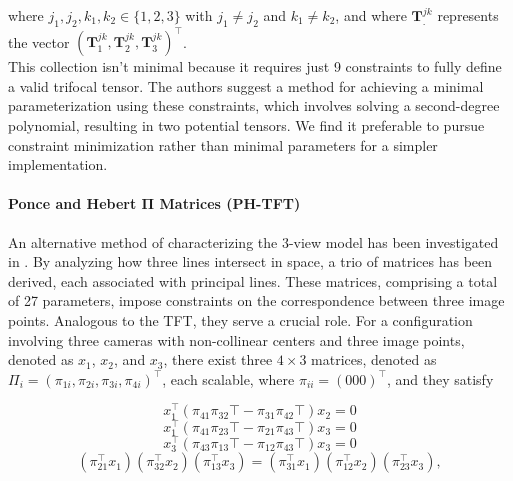 where \( j_1, j_2, k_1, k_2 \in \{1, 2, 3\} \) with \( j_1 \neq j_2 \) and \( k_1 \neq k_2 \), and where \( \bm{T}_.^{jk} \) represents the vector \( (\bm{T}_1^{jk}, \bm{T}_2^{jk}, \bm{T}_3^{jk})^\top \).\\

This collection isn't minimal because it requires just 9 constraints to fully define a valid trifocal tensor. The authors suggest a method for achieving a minimal parameterization using these constraints, which involves solving a second-degree polynomial, resulting in two potential tensors. We find it preferable to pursue constraint minimization rather than minimal parameters for a simpler implementation.

\paragraph{Ponce and Hebert \( \bm{\Pi} \) Matrices (\acs{PH-TFT})}
An alternative method of characterizing the 3-view model has been investigated in \cite{8-ponce-hebert-param}. By analyzing how three lines intersect in space, a trio of matrices has been derived, each associated with principal lines. These matrices, comprising a total of 27 parameters, impose constraints on the correspondence between three image points. Analogous to the TFT, they serve a crucial role. For a configuration involving three cameras with non-collinear centers and three image points, denoted as \( x_1 \), \( x_2 \), and \( x_3 \), there exist three \( 4 \times 3 \) matrices, denoted as \( \Pi_i = (\pi_{1i}, \pi_{2i}, \pi_{3i}, \pi_{4i})^\top \), each scalable, where \( \pi_{ii} = (0 0 0)^\top \), and they satisfy

\begin{equation}
	x_1^\top (\pi_{41}\pi_{32}\top - \pi_{31}\pi_{42}\top) x_2 = 0
	\label{eq:phConst1}
\end{equation}
\begin{equation}
	x_1^\top (\pi_{41}\pi_{23}\top - \pi_{21}\pi_{43}\top) x_3 = 0
	\label{eq:phConst2}
\end{equation}
\begin{equation}
	x_3^\top (\pi_{43}\pi_{13}\top - \pi_{12}\pi_{43}\top) x_3 = 0
	\label{eq:phConst3}
\end{equation}
\begin{equation}
	(\pi_{21}^\top x_1) (\pi_{32}^\top x_2) (\pi_{13}^\top x_3) = (\pi_{31}^\top x_1) (\pi_{12}^\top x_2) (\pi_{23}^\top x_3),
	\label{eq:phConst4}
\end{equation}

